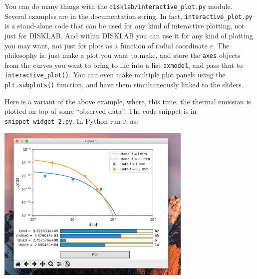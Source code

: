 \documentclass{book}
\newcommand{\code}[1]{{\small\tt #1}}
\begin{document}
You can do many things with the \code{disklab/interactive\_plot.py}
module. Several examples are in the documentation string. In fact,
\code{interactive\_plot.py} is a stand-alone code that can be used for any kind
of interactive plotting, not just for {\sf DISKLAB}. And within {\sf DISKLAB}
you can use it for any kind of plotting you may want, not just for plots as a
function of radial coordinate $r$. The philosophy is: just make a plot you want
to make, and store the \code{axes} objects from the curves you want to bring to
life into a list \code{axmodel}, and pass that to \code{interactive\_plot()}.
You can even make multiple plot panels using the \code{plt.subplots()}
function, and have them simultaneously linked to the sliders.

Here is a variant of the above example, where, this time, the thermal emission
is plotted on top of some ``observed data''. The code snippet is in
\code{snippet\_widget\_2.py}. In Python run it as:
\begin{codebox}
\end{codebox}
\centerline{\includegraphics[width=0.7\textwidth]{widget_example_2.png}}
\end{document}

